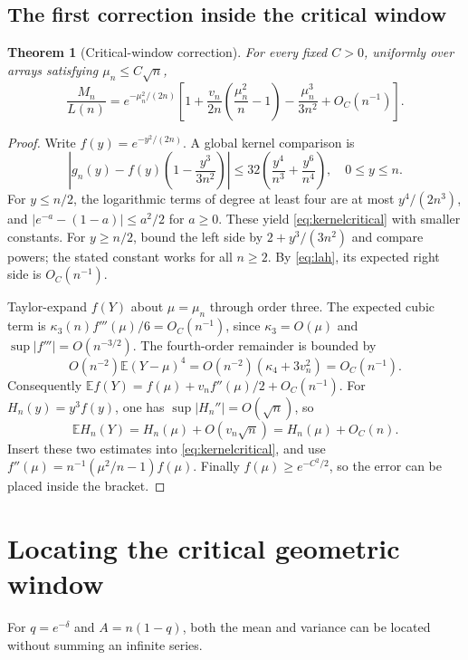 \documentclass[11pt,a4paper]{article}
\numberwithin{equation}{section}
\newtheorem{theorem}{Theorem}[section]
\theoremstyle{definition}\newtheorem{definition}[theorem]{Definition}
\theoremstyle{remark}\newtheorem{remark}[theorem]{Remark}
\newcommand{\E}{\mathbb E}
\begin{document}
\subsection{The first correction inside the critical window}
\begin{theorem}[Critical-window correction]\label{thm:criticalcorrection}
For every fixed $C>0$, uniformly over arrays satisfying $\mu_n\le C\sqrt n$,
\begin{equation}\label{eq:criticalcorrection}
 \frac{M_n}{L(n)}=e^{-\mu_n^2/(2n)}
 \left[1+\frac{v_n}{2n}\left(\frac{\mu_n^2}{n}-1\right)
          -\frac{\mu_n^3}{3n^2}+O_C(n^{-1})\right].
\end{equation}
\end{theorem}
\begin{proof}
Write $f(y)=e^{-y^2/(2n)}$. A global kernel comparison is
\begin{equation}\label{eq:kernelcritical}
 \left|g_n(y)-f(y)\left(1-\frac{y^3}{3n^2}\right)\right|
 \le32\left(\frac{y^4}{n^3}+\frac{y^6}{n^4}\right),\quad 0\le y\le n.
\end{equation}
For $y\le n/2$, the logarithmic terms of degree at least four are at most $y^4/(2n^3)$, and $|e^{-a}-(1-a)|\le a^2/2$ for $a\ge0$. These yield \eqref{eq:kernelcritical} with smaller constants. For $y\ge n/2$, bound the left side by $2+y^3/(3n^2)$ and compare powers; the stated constant works for all $n\ge2$.
By \eqref{eq:lah}, its expected right side is $O_C(n^{-1})$.

Taylor-expand $f(Y)$ about $\mu=\mu_n$ through order three. The expected cubic term is $\kappa_3(n)f'''(\mu)/6=O_C(n^{-1})$, since $\kappa_3=O(\mu)$ and $\sup|f'''|=O(n^{-3/2})$. The fourth-order remainder is bounded by
\[
 O(n^{-2})\E(Y-\mu)^4=O(n^{-2})(\kappa_4+3v_n^2)=O_C(n^{-1}).
\]
Consequently $\E f(Y)=f(\mu)+v_nf''(\mu)/2+O_C(n^{-1})$.
For $H_n(y)=y^3f(y)$, one has $\sup|H_n''|=O(\sqrt n)$, so
\[
 \E H_n(Y)=H_n(\mu)+O(v_n\sqrt n)=H_n(\mu)+O_C(n).
\]
Insert these two estimates into \eqref{eq:kernelcritical}, and use
$f''(\mu)=n^{-1}(\mu^2/n-1)f(\mu)$. Finally $f(\mu)\ge e^{-C^2/2}$, so the error can be placed inside the bracket.
\end{proof}

\section{Locating the critical geometric window}
\label{sec:mesh}
For $q=e^{-\delta}$ and $A=n(1-q)$, both the mean and variance can be located without summing an infinite series.
\end{document}
